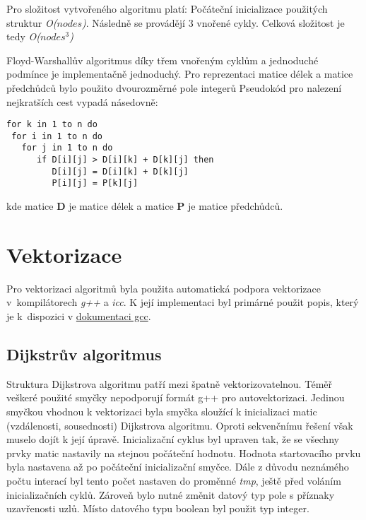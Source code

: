 \documentclass[a4paper,11pt]{article}
\begin{document}
Pro složitost vytvořeného algoritmu platí:
Počáteční inicializace použitých struktur \textit{O(${nodes}$)}. Následně se provádějí 3 vnořené cykly.
Celková složitost je tedy \textit{O(${nodes^3}$)}

Floyd-Warshallův algoritmus díky třem vnořeným cyklům a jednoduché podmínce je implementačně jednoduchý.
Pro reprezentaci matice délek a matice předchůdců bylo použito dvourozměrné pole integerů
Pseudokód pro nalezení nejkratších cest vypadá násedovně:

\lstset {language=C++}
\begin{lstlisting}
for k in 1 to n do
 for i in 1 to n do
   for j in 1 to n do
      if D[i][j] > D[i][k] + D[k][j] then
         D[i][j] = D[i][k] + D[k][j]
         P[i][j] = P[k][j]
\end{lstlisting}

kde matice \textbf{D} je matice délek a matice \textbf{P} je matice předchůdců.

\section{Vektorizace} \label{vektorizace}
Pro vektorizaci algoritmů byla použita automatická podpora vektorizace v~kompilátorech \textit{g++} a \textit{icc}. 
K její implementaci byl primárné použit popis, který je k~dispozici v %
\href{https://gcc.gnu.org/projects/tree-ssa/vectorization.html#vectorizab}{dokumentaci gcc}.

\subsection{Dijkstrův algoritmus}
Struktura Dijkstrova algoritmu patří mezi špatně vektorizovatelnou. Téměř veškeré použité smyčky nepodporují formát g++ pro 
autovektorizaci. Jedinou smyčkou vhodnou k vektorizaci byla smyčka sloužící k inicializaci matic (vzdálenosti, sousednosti) Dijkstrova algoritmu. Oproti sekvenčnímu řešení však
muselo dojít k její úpravě. Inicializační cyklus byl
upraven tak, že se všechny prvky matic nastavily na stejnou počáteční hodnotu. Hodnota startovacího prvku byla nastavena až po počáteční inicializační smyčce. Dále z důvodu neznámého
počtu interací byl tento počet nastaven do proměnné \textit{tmp}, ještě před voláním inicializačních cyklů.
Zároveň bylo nutné změnit datový typ pole s příznaky uzavřenosti uzlů. Místo datového typu boolean byl použit typ integer.
\end{document}
